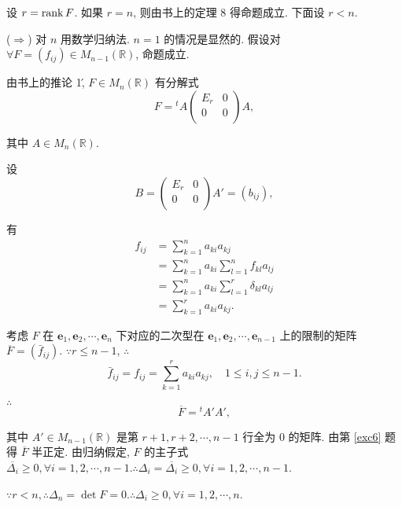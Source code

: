 \documentclass[color=black,device=normal,lang=cn,mode=geye]{elegantnote}
\begin{document}
\begin{solution}
    设 $r=\operatorname{rank} F$. 如果 $r=n$, 则由书上的定理 8 得命题成立. 下面设 $r<n$.

    ($\Rightarrow$) 对 $n$ 用数学归纳法. $n=1$ 的情况是显然的. 假设对 $\forall F=(f_{ij})\in M_{n-1}(\mathbb{R})$, 命题成立.
    
    由书上的推论 1\', $F\in M_n(\mathbb{R})$ 有分解式
    \[F={}^tA\begin{pmatrix}
        E_r & 0 \\
        0 & 0 \\
    \end{pmatrix}A,\]

    其中 $A\in M_n(\mathbb{R})$.
    
    设
    \[B=\begin{pmatrix}
        E_r & 0 \\
        0 & 0 \\
    \end{pmatrix}A'=(b_{ij}),\]
    
    有
    \begin{align*}
        f_{ij} & =\sum\limits_{k=1}^na_{ki}a_{kj} \\
        & =\sum\limits_{k=1}^na_{ki}\sum\limits_{l=1}^nf_{kl}a_{lj} \\
        & =\sum\limits_{k=1}^na_{ki}\sum\limits_{l=1}^r\delta_{kl}a_{lj} \\
        & =\sum\limits_{k=1}^ra_{ki}a_{kj}.
    \end{align*}

    考虑 $F$ 在 $\boldsymbol{e}_1,\boldsymbol{e}_2,\cdots,\boldsymbol{e}_n$ 下对应的二次型在 $\boldsymbol{e}_1,\boldsymbol{e}_2,\cdots,\boldsymbol{e}_{n-1}$ 上的限制的矩阵 $\overline{F}=(\bar{f}_{ij})$. $\because r\leq n-1$, $\therefore$
    \[\bar{f}_{ij}=f_{ij}=\sum\limits_{k=1}^ra_{ki}a_{kj},\quad1\leq i,j\leq n-1.\]

    $\therefore$
    \[\overline{F}={}^tA'A',\]

    其中 $A'\in M_{n-1}(\mathbb{R})$ 是第 $r+1,r+2,\cdots,n-1$ 行全为 $0$ 的矩阵. 由第 \ref{exc6} 题得 $\overline{F}$ 半正定. 由归纳假定, $F$ 的主子式 $\overline{\Delta_i}\geq0,\forall i=1,2,\cdots,n-1.\therefore\Delta_i=\overline{\Delta_i}\geq0,\forall i=1,2,\cdots,n-1$.

    $\because r<n,\therefore\Delta_n=\det F=0.\therefore\Delta_i\geq0,\forall i=1,2,\cdots,n$.

    

\end{solution}
\end{document}
